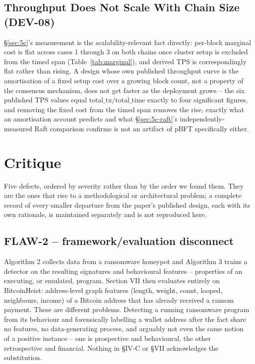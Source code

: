 \documentclass[conference]{IEEEtran}
\begin{document}
\subsection{Throughput Does Not Scale With Chain Size (DEV-08)}
\label{sec:dev08}

\S\ref{sec:5c}'s measurement is the scalability-relevant fact directly: per-block marginal cost is
flat across cases 1 through 3 on both chains once cluster setup is excluded from the timed span
(Table~\ref{tab:marginal}), and derived TPS is correspondingly flat rather than rising. A design
whose own published throughput curve is the amortisation of a fixed setup cost over a growing
block count, not a property of the consensus mechanism, does not get faster as the deployment
grows -- the six published TPS values equal $\text{total\_tx}/\text{total\_time}$ exactly to four
significant figures, and removing the fixed cost from the timed span removes the rise, exactly
what an amortisation account predicts and what \S\ref{sec:5c-raft}'s independently-measured Raft
comparison confirms is not an artifact of pBFT specifically either.

\section{Critique}
\label{sec:critique}

Five defects, ordered by severity rather than by the order we found them. They are the ones
that rise to a methodological or architectural problem; a complete record of every smaller
departure from the paper's published design, each with its own rationale, is maintained
separately and is not reproduced here.

\subsection{FLAW-2 -- framework/evaluation disconnect}
\label{sec:flaw2}

Algorithm 2 collects data from a ransomware honeypot and Algorithm 3 trains a detector on the
resulting signatures and behavioural features -- properties of an executing, or emulated,
program. Section VII then evaluates entirely on BitcoinHeist: address-level graph features
(length, weight, count, looped, neighbours, income) of a Bitcoin address that has already
received a ransom payment. These are different problems. Detecting a running ransomware program
from its behaviour and forensically labelling a wallet address after the fact share no features,
no data-generating process, and arguably not even the same notion of a positive instance -- one
is prospective and behavioural, the other retrospective and financial. Nothing in \S IV-C or
\S VII acknowledges the substitution.
\end{document}
